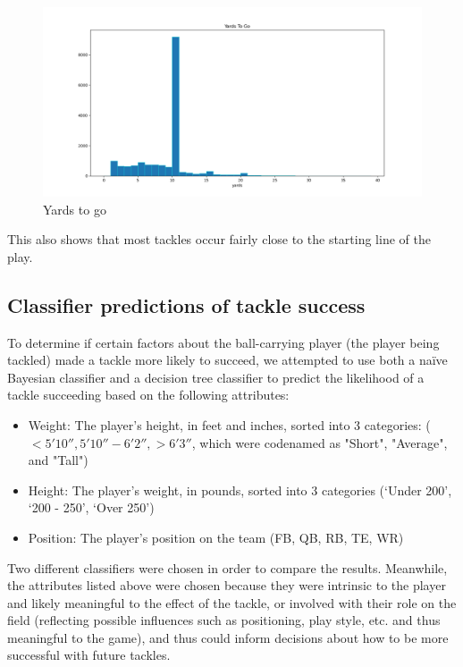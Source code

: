 \documentclass[bibtex, sigconf, hyperref={colorlinks=true,linkcolor=blue,urlcolor=blue}]{acmart}
\begin{document}
\begin{figure}[h]
  \centering
  \includegraphics[width=\linewidth]{../src/yards.png}
  \caption{Yards to go}
\end{figure}

This also shows that most tackles occur fairly close to the starting line of the play.

\subsection{Classifier predictions of tackle success}

To determine if certain factors about the ball-carrying player (the player being tackled)
made a tackle more likely to succeed, we attempted to use both a na\"ive Bayesian
classifier and a decision tree classifier to predict the likelihood of a tackle succeeding
based on the following attributes:

\begin{itemize}
\item Weight: The player's height, in feet and inches, sorted into 3 categories: ($< 5'10'',
5'10''-6'2'', > 6'3''$, which were codenamed as "Short", "Average", and "Tall")
\item Height: The player's weight, in pounds, sorted into 3 categories (`Under 200', `200 -
250', `Over 250')
\item Position: The player's position on the team (FB, QB, RB, TE, WR)
\end{itemize}

Two different classifiers were chosen in order to compare the results. Meanwhile,
the attributes listed above were chosen because they were intrinsic to the player
and likely meaningful to the effect of the tackle, or involved with their role on the field
(reflecting possible influences such as positioning, play style, etc. and thus
meaningful to the game), and thus could inform decisions about how to be more successful
with future tackles.
\end{document}
